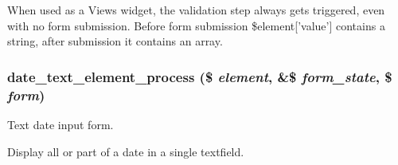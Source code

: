 When used as a Views widget, the validation step always gets triggered, even with no form submission. Before form submission \$element\mbox{[}'value'\mbox{]} contains a string, after submission it contains an array. \hypertarget{date__api__elements_8inc_ac1b734f1dbb476fe75e096be3dac5d6d}{
\subsubsection[{date\_\-text\_\-element\_\-process}]{\setlength{\rightskip}{0pt plus 5cm}date\_\-text\_\-element\_\-process (\$ {\em element}, \/  \&\$ {\em form\_\-state}, \/  \$ {\em form})}}
\label{date__api__elements_8inc_ac1b734f1dbb476fe75e096be3dac5d6d}
Text date input form.

Display all or part of a date in a single textfield.

